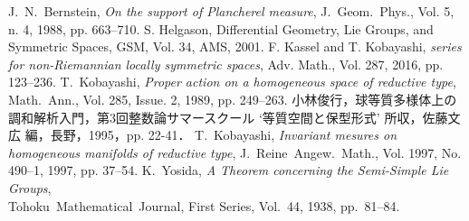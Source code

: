 \documentclass[12pt,dvipdfmx,uplatex]{jsarticle}
\begin{document}
\begin{thebibliography}{99}
  \vspace{-0.5em}
 J.~N.~Bernstein, \textit{On the support of Plancherel measure}, J.~Geom.~Phys., Vol. 5, n. 4, 1988, pp. 663--710.
 S. Helgason, Differential Geometry, Lie Groups, and Symmetric Spaces, GSM, Vol. 34, AMS, 2001.
 F. Kassel and T. Kobayashi, \textit{{\Poincare} series for non-Riemannian locally symmetric spaces}, Adv. Math., Vol. 287, 2016, pp. 123--236.
 T.~Kobayashi, 
  \textit{Proper action on a homogeneous space of reductive type},
  Math.~Ann., Vol. 285, Issue. 2, 1989, pp. 249--263.
 小林俊行，球等質多様体上の調和解析入門，第3回整数論サマースクール `等質空間と保型形式' 所収，佐藤文広 編，長野，1995，pp. 22-41．
 T.~Kobayashi, \textit{Invariant mesures on homogeneous manifolds of reductive type}, J.~Reine~Angew.~Math., Vol. 1997, No. 490--1, 1997, pp. 37--54.
 K.~Yosida, \textit{A Theorem concerning the Semi-Simple Lie Groups}, \\Tohoku~Mathematical~Journal, First Series, Vol.~44, 1938, pp.~81--84.
\end{thebibliography}
\end{document}
